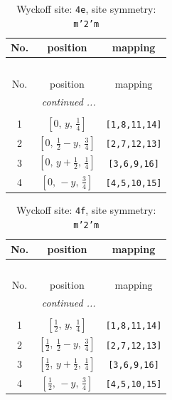 \documentclass[fleqn,8pt]{jsarticle}
\begin{document}
\renewcommand{\arraystretch}{1.2}
\begin{longtable}{ccc}
\caption{Wyckoff site: {\tt 4e}, site symmetry: {\tt m'2'm}}
 \\
 \hline \hline
No. & position & mapping \\ \hline \endfirsthead

\multicolumn{2}{l}{\tablename\ \thetable{}} \\
 \hline \hline
No. & position & mapping \\ \hline \endhead

 \hline \hline
\multicolumn{2}{r}{\footnotesize\it continued ...} \\ \endfoot

 \hline \hline
\multicolumn{2}{r}{} \\ \endlastfoot

1 & $\left[ 0,\, y,\, \frac{1}{4} \right]$ & {\tt [1,8,11,14]} \\ \hline
2 & $\left[ 0,\, \frac{1}{2} - y,\, \frac{3}{4} \right]$ & {\tt [2,7,12,13]} \\ \hline
3 & $\left[ 0,\, y + \frac{1}{2},\, \frac{1}{4} \right]$ & {\tt [3,6,9,16]} \\ \hline
4 & $\left[ 0,\, - y,\, \frac{3}{4} \right]$ & {\tt [4,5,10,15]} \\
\end{longtable}
\renewcommand{\arraystretch}{1.2}
\begin{longtable}{ccc}
\caption{Wyckoff site: {\tt 4f}, site symmetry: {\tt m'2'm}}
 \\
 \hline \hline
No. & position & mapping \\ \hline \endfirsthead

\multicolumn{2}{l}{\tablename\ \thetable{}} \\
 \hline \hline
No. & position & mapping \\ \hline \endhead

 \hline \hline
\multicolumn{2}{r}{\footnotesize\it continued ...} \\ \endfoot

 \hline \hline
\multicolumn{2}{r}{} \\ \endlastfoot

1 & $\left[ \frac{1}{2},\, y,\, \frac{1}{4} \right]$ & {\tt [1,8,11,14]} \\ \hline
2 & $\left[ \frac{1}{2},\, \frac{1}{2} - y,\, \frac{3}{4} \right]$ & {\tt [2,7,12,13]} \\ \hline
3 & $\left[ \frac{1}{2},\, y + \frac{1}{2},\, \frac{1}{4} \right]$ & {\tt [3,6,9,16]} \\ \hline
4 & $\left[ \frac{1}{2},\, - y,\, \frac{3}{4} \right]$ & {\tt [4,5,10,15]} \\
\end{longtable}
\end{document}
